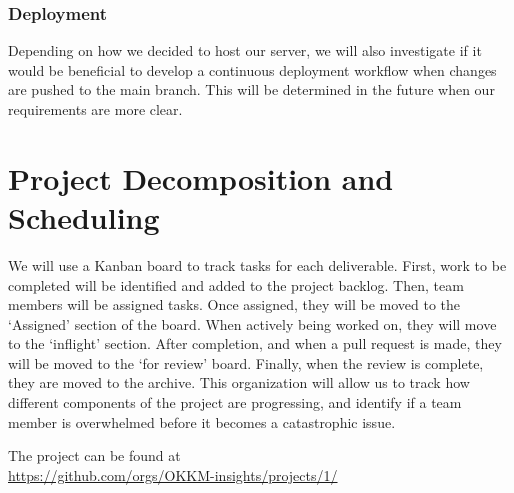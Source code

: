\documentclass{article}
\begin{document}
\subsubsection{Deployment}
Depending on how we decided to host our server, we will also investigate if it would be beneficial to develop a continuous deployment workflow when changes are 
pushed to the main branch. This will be determined in the future when our requirements are more clear.
\section{Project Decomposition and Scheduling}


We will use a Kanban board to track tasks for each deliverable. First, work to be completed will be identified and added to the project backlog.
Then, team members will be assigned tasks. Once assigned, they will be moved to the `Assigned' section of the board. When actively being worked on, they will
move to the `inflight' section. After completion, and when a pull request is made, they will be moved to the `for review' board. Finally, when the review is
complete, they are moved to the archive. This organization will allow us to track how different components of the project are progressing, and identify
if a team member is overwhelmed before it becomes a catastrophic issue.

The project can be found at \\\url{https://github.com/orgs/OKKM-insights/projects/1/}
\end{document}

